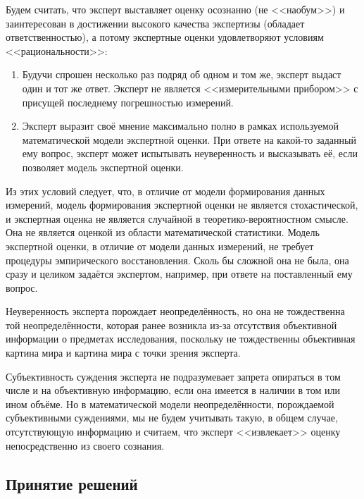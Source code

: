 Будем считать, что эксперт выставляет оценку осознанно (не <<наобум>>) и заинтересован в достижении высокого качества экспертизы (обладает ответственностью), а потому экспертные оценки удовлетворяют условиям <<рациональности>>:
\begin{enumerate}
 \item Будучи спрошен несколько раз подряд об одном и том же, эксперт выдаст один и тот же ответ. Эксперт не является <<измерительными прибором>> с присущей последнему погрешностью измерений. 
 \item Эксперт выразит своё мнение максимально полно в рамках используемой математической модели экспертной оценки. При ответе на какой-то заданный ему вопрос, эксперт может испытывать неуверенность и высказывать её, если позволяет модель экспертной оценки.
\end{enumerate}

 Из этих условий следует, что, в отличие от модели формирования данных измерений, модель формирования экспертной оценки не является стохастической, и экспертная оценка не является случайной в теоретико-вероятностном смысле. Она не является оценкой из области математической статистики. Модель экспертной оценки, в отличие от модели данных измерений, не требует процедуры эмпирического восстановления. Сколь бы сложной она не была, она сразу и целиком задаётся экспертом, например, при ответе на поставленный ему вопрос.
  
 Неуверенность эксперта  порождает неопределённость, но она не тождественна той неопределённости, которая ранее возникла из-за отсутствия объективной информации о предметах исследования, поскольку не тождественны объективная картина мира и картина мира с точки зрения эксперта. 
 
Субъективность суждения эксперта не подразумевает запрета опираться в том числе и на объективную информацию, если она имеется в наличии в том или ином объёме. Но в математической модели неопределённости, порождаемой субъективными суждениями, мы не будем учитывать такую, в общем случае, отсутствующую информацию и считаем, что эксперт <<извлекает>> оценку непосредственно из своего сознания. 


\subsection{Принятие решений}
\label{sec:intro_decision}

